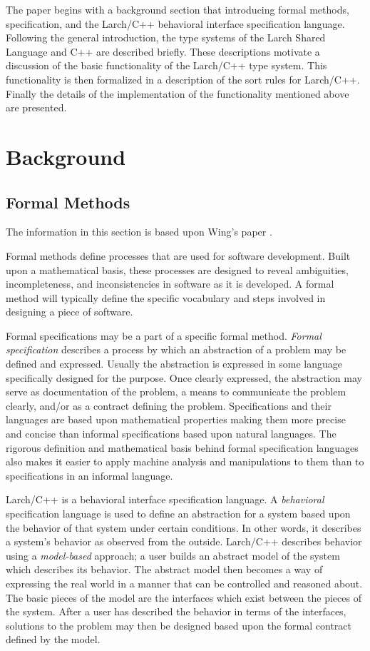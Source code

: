 The paper begins with a background section that introducing formal
methods, specification, and the Larch/C++ behavioral interface
specification language. Following the general introduction, the type
systems of the Larch Shared Language and C++ are described
briefly. These descriptions motivate a discussion of the basic
functionality of the Larch/C++ type system. This functionality is then
formalized in a description of the sort rules for Larch/C++. Finally
the details of the implementation of the functionality mentioned above
are presented.

\section{Background}
\label{background}
\subsection{Formal Methods}

The information in this section is based upon Wing's
paper \cite{Wing90a}. 

Formal methods define processes that are used for software
development. Built upon a mathematical basis, these processes are
designed to reveal ambiguities, incompleteness, and inconsistencies in
software as it is developed. A formal method will
typically define the specific vocabulary and steps involved in
designing a piece of software.

Formal specifications may be a part of a specific formal
method. \emph{Formal specification} describes a process by which an
abstraction of a problem may be defined and expressed. Usually the
abstraction is expressed in some language specifically
designed for the purpose. Once clearly expressed, the abstraction may serve
as documentation of the problem, a means to communicate the problem
clearly, and/or as a contract defining the problem. Specifications and
their languages are based upon mathematical properties making
them more precise and concise than informal specifications based upon
natural languages. The rigorous definition and mathematical basis
behind formal specification languages also makes it easier to apply machine
analysis and manipulations to them than to specifications in an
informal language.

Larch/C++ is a behavioral interface specification language. A \emph{behavioral}
specification language is used to define an abstraction for a system
based upon the behavior of that system under certain conditions. In
other words, it describes a system's behavior as observed from the
outside. Larch/C++ describes behavior using a
\emph{model-based} approach; a user builds an abstract model of the system
which describes its behavior. The abstract model then becomes a way of
expressing the real world in a manner that can be controlled and
reasoned about. The basic pieces of the model are the interfaces which
exist between the pieces of the system. After a user has described the
behavior in terms of the interfaces, solutions to the problem may then
be designed based upon the formal contract defined by the model.


